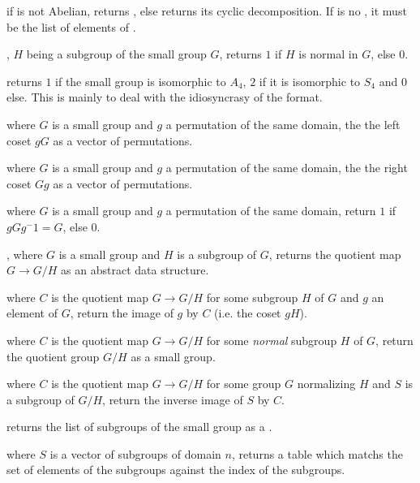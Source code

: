  if  is not Abelian,
returns , else returns its cyclic decomposition. If  is no
, it must be the list of elements of .

, $H$ being a subgroup of the
small group $G$, returns $1$ if $H$ is normal in $G$, else $0$.

 returns $1$ if the small group
 is isomorphic to $A_4$, $2$ if it is isomorphic to $S_4$ and
$0$ else. This is mainly to deal with the idiosyncrasy of the format.

 where $G$ is a small group and $g$ a
permutation of the same domain, the the left coset $gG$ as a vector of
permutations.

 where $G$ is a small group and $g$ a
permutation of the same domain, the the right coset $Gg$  as a vector of
permutations.

 where $G$ is a small group and
$g$ a permutation of the same domain, return $1$ if $gGg^-1=G$, else $0$.

, where $G$ is a small group and
$H$ is a subgroup of $G$, returns the quotient map $G\rightarrow G/H$
as an abstract data structure.

 where $C$ is the quotient map
$G\rightarrow G/H$ for some subgroup $H$ of $G$ and $g$ an element of $G$,
return the image of $g$ by $C$ (i.e. the coset $gH$).

 where $C$ is the quotient map
$G\rightarrow G/H$ for some \emph{normal} subgroup $H$ of $G$, return the
quotient group $G/H$ as a small group.

 where $C$ is the
quotient map $G\rightarrow G/H$ for some group $G$ normalizing $H$ and $S$ is
a subgroup of $G/H$, return the inverse image of $S$ by $C$.

 returns the list of subgroups of the
small group  as a .

 where $S$ is a vector of subgroups
of domain $n$, returns a table which matchs the set of elements of the
subgroups against the index of the subgroups.

